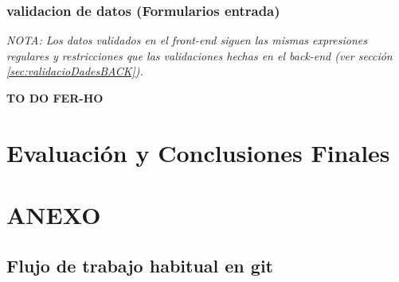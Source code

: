 \documentclass[a4paper,12pt]{report}
\begin{document}
	
	
	\subsection{validacion de datos (Formularios entrada)}
	\label{sec:validacioDadesFRONT}
	
	\textit{NOTA: Los datos validados en el front-end siguen las mismas expresiones regulares y restricciones que las validaciones hechas en el back-end (ver sección \ref{sec:validacioDadesBACK}).}
	
	\textbf{TO DO FER-HO}
		
		
	\chapter{Evaluación y Conclusiones Finales} %
	

	
	
	
	

	
	
	
	
	
	
	
	
	
	
	
	
	
	
	
	
	
	
	
	
	
	
	
	
	
	
	
	
	
	
	
	
	
	
	
	
	
	
	
	
	\chapter{ANEXO}
	\label{chap:anexo} %
		
			
		\section{Flujo de trabajo habitual en git}
		\label{sec:anexoFlujoGit}
		
\end{document}
